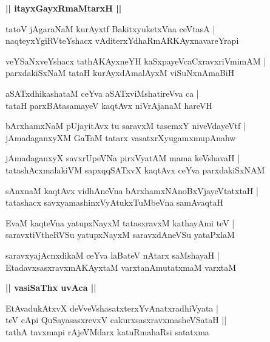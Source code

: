 \documentclass[twoside,12pt,openright]{book}
\newcounter{shloka}[chapter]
\def\uvaca#1{\centerline{{\large\textbf{#1}}}}
\begin{document}
\uvaca{|| itayxGayxRmaMtarxH ||}

\begin{shloka}%
tatoV jAgaraNaM kurAyxtf BakitxyuketxVna ceVtasA |\\
naqteyxYgiRVteYshacx vAditerxYdhaRmARKAyxnavareYrapi
\end{shloka}

\begin{shloka}%
veYSaNxveYshacx tathAKAyxneYH kaSxpayeVcaCxravxriVmimAM |\\
parxdakiSxNaM tataH kurAyxdAmalAyxM viSuNxnAmaBiH 
\end{shloka}

\begin{shloka}%
aSATxdhikashataM ceYva aSATxviMshatireVva ca |\\
tataH parxBAtasamayeV kaqtAvx niVrAjanaM hareVH
\end{shloka}

\begin{shloka}%
bArxhamxNaM pUjayitAvx tu saravxM tasemxY niveVdayeVtf |\\
jAmadaganxyXM GaTaM tatarx vasatxrXyugamxmupAnahw
\end{shloka}

\begin{shloka}%
jAmadaganxyX savxrUpeVNa pirxVyatAM mama keVshavaH |\\
tatashAcxmalakiVM sapxqqSATxvX kaqtAvx ceYva parxdakiSxNAM
\end{shloka}

\begin{shloka}%
sAnxnaM kaqtAvx vidhAneVna bArxhamxNAnoBxVjayeVtatxtaH |\\
tatashacx savxyamashinxVyAtukxTuMbeVna samAvaqtaH
\end{shloka}

\begin{shloka}%
EvaM kaqteVna yatupxNayxM tatasxravxM kathayAmi teV |\\
saravxtiVtheRVSu yatupxNayxM saravxdAneVSu yataPxlaM
\end{shloka}

\begin{shloka}%
saravxyajAcnxdikaM ceYva laBateV nAtarx saMshayaH |\\
EtadavxsasxravxmAKAyxtaM varxtanAmutatxmaM varxtaM
\end{shloka}

\uvaca{|| vasiSaThx uvAca ||}

\begin{shloka}%
EtAvadukAtxvX deVveVshasatxterxYvAnatxradhiVyata |\\
teV cApi QuSayasasxrevxV cakurxsasxravxmasheVSataH ||\\
tathA tavxmapi rAjeVMdarx katuRmahaRsi satatxma
\end{shloka}
\end{document}
